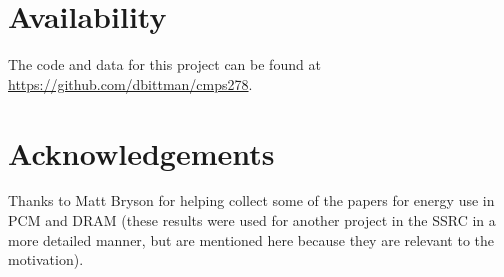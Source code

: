 \documentclass[twocolumn,11pt]{article}
\begin{document}














\section*{Availability}
The code and data for this project can be found
at \url{https://github.com/dbittman/cmps278}.

\section*{Acknowledgements}

Thanks to Matt Bryson for helping collect some of the papers for energy use
in PCM and DRAM (these results were used for another project in the SSRC in a
more detailed manner, but are mentioned here because they are relevant to
the motivation).



\end{document}

